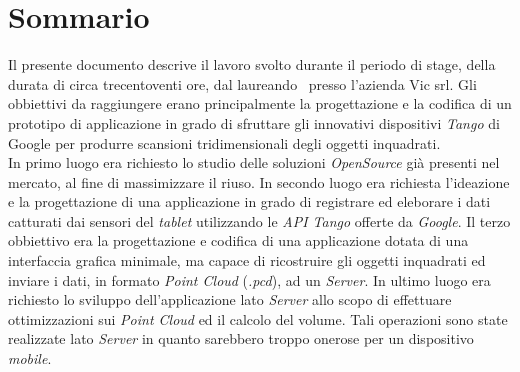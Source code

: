 
\cleardoublepage
{}
{}
\begingroup
\let\clearpage\relax
\let\cleardoublepage\relax
\let\cleardoublepage\relax

\chapter*{Sommario}

Il presente documento descrive il lavoro svolto durante il periodo di stage, della durata di circa trecentoventi ore, dal laureando \myName \ presso l'azienda Vic srl.
Gli obbiettivi da raggiungere erano principalmente la progettazione e la codifica di un prototipo di applicazione in grado di sfruttare gli innovativi dispositivi \emph{Tango} di Google per produrre scansioni tridimensionali degli oggetti inquadrati.\\
In primo luogo era richiesto lo studio delle soluzioni \emph{OpenSource} già presenti nel mercato, al fine di massimizzare il riuso.
In secondo luogo era richiesta l'ideazione e la progettazione di una applicazione in grado di registrare ed eleborare i dati catturati dai sensori del \emph{tablet} utilizzando le \emph{API Tango} offerte da \emph{Google}. 
Il terzo obbiettivo era la progettazione e codifica di una applicazione dotata di una interfaccia grafica minimale, ma capace di ricostruire gli oggetti inquadrati ed inviare i dati, in formato \emph{Point Cloud} (\emph{.pcd}), ad un \emph{Server}.
In ultimo luogo era richiesto lo sviluppo dell'applicazione lato \emph{Server} allo scopo di effettuare ottimizzazioni sui \emph{Point Cloud} ed il calcolo del volume. Tali operazioni sono state realizzate lato \emph{Server} in quanto sarebbero troppo onerose per un dispositivo \emph{mobile}.

%
%

\endgroup			

\vfill

